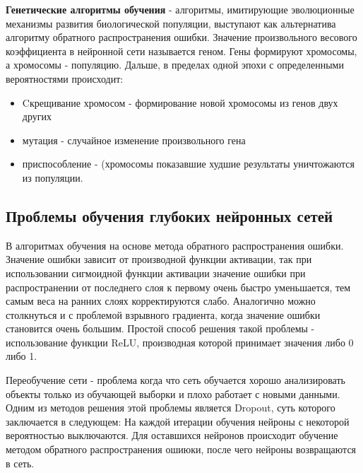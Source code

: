 \textbf{Генетические алгоритмы обучения} - алгоритмы, имитирующие эволюционные механизмы развития биологической популяции, выступают как альтернатива алгоритму обратного распространения ошибки. Значение произвольного весового коэффициента в нейронной сети называется геном. Гены формируют хромосомы, а хромосомы - популяцию. Дальше, в пределах одной эпохи с определенными вероятностями происходит: 
 \begin{itemize}
     \item Cкрещивание хромосом - формирование новой хромосомы из генов двух других
     \item мутация - случайное изменение произвольного гена
     \item приспособление - (хромосомы показавшие худшие результаты уничтожаются из популяции.
 \end{itemize}

% 

\subsection{Проблемы обучения глубоких нейронных сетей}

В алгоритмах обучения на основе метода обратного распространения ошибки. Значение ошибки зависит от производной функции активации, так при использовании сигмоидной функции активации значение ошибки при распространении от последнего слоя к первому очень быстро уменьшается, тем самым веса на ранних слоях корректируются слабо. Аналогично можно столкнуться и с проблемой взрывного градиента, когда значение ошибки становится очень большим. Простой способ решения такой проблемы - использование функции ReLU, производная которой принимает значения либо 0 либо 1.

Переобучение сети - проблема когда что сеть обучается хорошо анализировать объекты только из обучающей выборки и плохо работает с новыми данными. Одним из методов решения этой проблемы является Dropout, суть которого заключается в следующем: На каждой итерации обучения нейроны с некоторой вероятностью выключаются. Для оставшихся нейронов происходит обучение методом обратного распространения ошиюки, после чего нейроны возвращаются в сеть. 




\clearpage